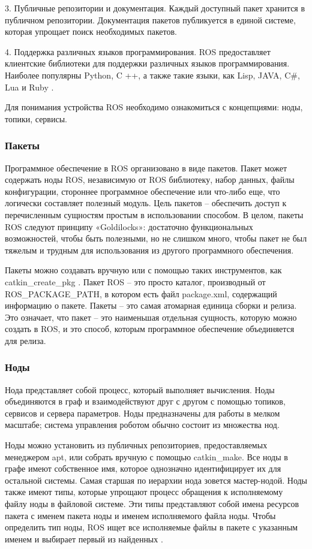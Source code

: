 3. Публичные репозитории и документация. Каждый доступный пакет хранится в публичном репозитории. Документация пакетов публикуется в единой системе, которая упрощает поиск необходимых пакетов.

4. Поддержка различных языков программирования. ROS предоставляет клиентские библиотеки для поддержки различных языков программирования. Наиболее популярны Python, C ++, а также такие языки, как Lisp, JAVA, C\#, Lua и Ruby \cite{voltbro}.

Для понимания устройства ROS необходимо ознакомиться с концепциями: ноды, топики, сервисы.

\subsubsection{Пакеты}
Программное обеспечение в ROS организовано в виде пакетов. Пакет может содержать ноды ROS, независимую от ROS библиотеку, набор данных, файлы конфигурации, стороннее программное обеспечение или что-либо еще, что логически составляет полезный модуль. Цель пакетов -- обеспечить доступ к перечисленным сущностям простым в использовании способом. В целом, пакеты ROS следуют принципу «Goldilocks»: достаточно функциональных возможностей, чтобы быть полезными, но не слишком много, чтобы пакет не был тяжелым и трудным для использования из другого программного обеспечения.

Пакеты можно создавать вручную или с помощью таких инструментов, как catkin\_create\_pkg . Пакет ROS -- это просто каталог, производный от ROS\_PACKAGE\_PATH, в котором есть файл package.xml, содержащий информацию о пакете. Пакеты -- это самая атомарная единица сборки и релиза. Это означает, что пакет -- это наименьшая отдельная сущность, которую можно создать в ROS, и это способ, которым программное обеспечение объединяется для релиза.

\subsubsection{Ноды}
Нода представляет собой процесс, который выполняет вычисления. Ноды объединяются в граф и взаимодействуют друг с другом с помощью топиков, сервисов и сервера параметров. Ноды предназначены для работы в мелком масштабе; система управления роботом обычно состоит из множества нод.

Ноды можно установить из публичных репозиториев, предоставляемых менеджером apt, или собрать вручную с помощью catkin\_make.
Все ноды в графе имеют собственное имя, которое однозначно идентифицирует их для остальной системы. Самая старшая по иерархии нода зовется мастер-нодой. Ноды также имеют типы, которые упрощают процесс обращения к исполняемому файлу ноды в файловой системе. Эти типы представляют собой имена ресурсов пакета с именем пакета ноды и именем исполняемого файла ноды. Чтобы определить тип ноды, ROS ищет все исполняемые файлы в пакете с указанным именем и выбирает первый из найденных \cite{ros}. 

